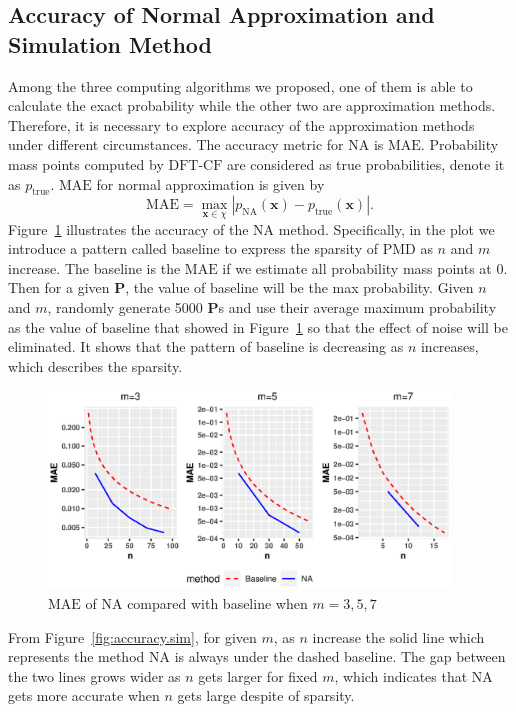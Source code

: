\documentclass[12pt]{article}
\newcommand{\Pmat}{\mathbf{P}}
\newcommand{\MAE}{{\textrm{MAE}}}
\newcommand{\PMD}{\textrm{PMD}}
\newcommand{\xvec}{\boldsymbol{x}}
\newcommand{\NA}{{\textrm{NA}}}
\newcommand{\dft}{{\textrm{DFT-CF}}}
\begin{document}
\subsection{Accuracy of Normal Approximation and Simulation Method}
Among the three computing algorithms we proposed, one of them is able to calculate the exact probability while the other two are approximation methods. Therefore, it is necessary to explore accuracy of the approximation methods under different circumstances. The accuracy metric for $\NA$ is $\MAE$. Probability mass points computed by $\dft$ are considered as true probabilities, denote it as $p_{\textrm{true}}$.
$\MAE$ for normal approximation is given by
\begin{equation*}
    \MAE = \max_{\xvec \in \chi}|p_{\NA}(\xvec)-p_{\textrm{true}}(\xvec)|.
\end{equation*}
Figure~\ref{fig:mae.na} illustrates the accuracy of the $\NA$ method. Specifically, in the plot we introduce a pattern called baseline to express the sparsity of $\PMD$ as $n$ and $m$ increase. The baseline is the $\MAE$ if we estimate all probability mass points at 0. Then for a given $\Pmat$, the value of baseline will be the max probability. Given $n$ and $m$,  randomly generate 5000 $\Pmat$s and use their average maximum probability as the value of baseline that showed in Figure~\ref{fig:mae.na} so that the effect of noise will be eliminated. It shows that the pattern of baseline is decreasing as $n$ increases, which describes the sparsity.
\begin{figure}%
\begin{center}
	\includegraphics[width=0.95\textwidth]{figures/normal_mae.eps}
	\caption{$\MAE$ of $\NA$ compared with baseline when $m=3,5,7$}
	\label{fig:mae.na}
\end{center}
\end{figure}
From Figure~\ref{fig:accuracy.sim}, for given $m$, as $n$ increase the solid line which represents the method $\NA$ is always under the dashed baseline. The gap between the two lines grows wider as $n$ gets larger for fixed $m$, which indicates that $\NA$ gets more accurate when $n$ gets large despite of sparsity.
\end{document}
